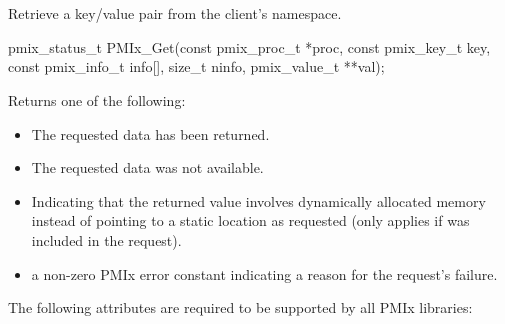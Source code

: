 \section{}

\summary

Retrieve a key/value pair from the client's namespace.

\format

\cspecificstart
\begin{codepar}
pmix_status_t
PMIx_Get(const pmix_proc_t *proc, const pmix_key_t key,
         const pmix_info_t info[], size_t ninfo,
         pmix_value_t **val);
\end{codepar}
\cspecificend

\begin{arglist}
\end{arglist}

Returns one of the following:

\begin{itemize}
\item {} The requested data has been returned.
\item {} The requested data was not available.
\item {} Indicating that the returned value
involves dynamically allocated memory instead of pointing to a static location
as requested (only applies if  was included in the request).
\item a non-zero \ac{PMIx} error constant indicating a reason for the request's failure.
\end{itemize}

\reqattrstart
The following attributes are required to be supported by all \ac{PMIx} libraries:


